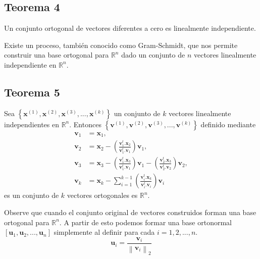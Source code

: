 \documentclass[12pt, a4paper]{article}
\numberwithin{subsection}{section} %
\begin{document}
        \subsection{\textnormal{Teorema 4}}
        
        Un conjunto ortogonal de vectores diferentes a cero es linealmente independiente.
        
        Existe  un proceso, también conocido como Gram-Schmidt, que nos permite construir una base ortogonal para $\mathbb{R}^{n}$ dado un conjunto de $n$ vectores linealmente independiente en $\mathbb{R}^{n}$.
        
        \subsection{\textnormal{Teorema 5}}
        
        Sea $\left\{ \textbf{x}^{\left( 1 \right)}, \textbf{x}^{\left( 2 \right)}, \textbf{x}^{\left( 3 \right)}, ..., \textbf{x}^{\left( k \right)} \right\}$ un conjunto de $k$ vectores linealmente independientes en $\mathbb{R}^{n}$. Entonces $\left\{ \textbf{v}^{\left( 1 \right)}, \textbf{v}^{\left( 2 \right)}, \textbf{v}^{\left( 3 \right)}, ..., \textbf{v}^{\left( k \right)} \right\}$ definido mediante
        \begin{align*}
        \textbf{v}_{1} &= \textbf{x}_{1}, \\
        \textbf{v}_{2} &= \textbf{x}_{2} - \left( \frac{ \textbf{v}_{1}^{t} .\textbf{x}_{2}}{ \textbf{v}_{1}^{t} .\textbf{v}_{1}} \right)\textbf{v}_{1}, \\
        \textbf{v}_{3} &= \textbf{x}_{3} - \left( \frac{ \textbf{v}_{1}^{t} .\textbf{x}_{3}}{ \textbf{v}_{1}^{t} .\textbf{v}_{1}} \right)\textbf{v}_{1} - \left( \frac{ \textbf{v}_{2}^{t} .\textbf{x}_{3}}{ \textbf{v}_{2}^{t} .\textbf{v}_{2}} \right)\textbf{v}_{2}, \\
        \textbf{v}_{k} &= \textbf{x}_{k} - \sum_{i=1}^{k-1} \left( \frac{ \textbf{v}_{i}^{t} .\textbf{x}_{k}}{ \textbf{v}_{i}^{t} .\textbf{v}_{i}} \right)\textbf{v}_{i}
        \end{align*}
        es un conjunto de $k$ vectores ortogonales es $\mathbb{R}^{n}$.
        
        Observe que cuando el conjunto original de vectores construidos forman una base ortogonal para $\mathbb{R}^{n}$. A partir de esto podemos formar una base ortonormal $\left[ \textbf{u}_{1}, \textbf{u}_{2}, ... , \textbf{u}_{n} \right]$ simplemente al definir para cada $i = 1, 2, ..., n$.
        \begin{equation}
        \textbf{u}_{i} = \frac{ \textbf{v}_{i} }{\left\| \textbf{v}_{i} \right\|_{2}}
        \end{equation}
        
\end{document}

